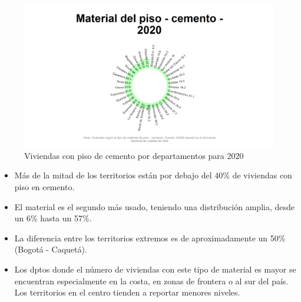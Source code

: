     \begin{figure}[H]
        \caption{Viviendas con piso de cemento por departamentos para 2020 \label{map_result_2} }
        \begin{center}
        \includegraphics[width=\textwidth,keepaspectratio]{img/var_177_static.png}    
        \end{center}
    \end{figure}
            \begin{itemize}
                    \item Más de la mitad de los territorios están por debajo del 40\% de viviendas con piso en cemento.
                    \item El material es el segundo más usado, teniendo una distribución amplia, desde un 6\% hasta un 57\%.
                    \item La diferencia entre los territorios extremos es de aproximadamente un 50\% (Bogotá - Caquetá).
                    \item Los dptos donde el número de viviendas con este tipo de material es mayor se encuentran especialmente en la costa, en zonas de frontera o al sur del país. Los territorios en el centro tienden a reportar menores niveles.
                    \end{itemize}

